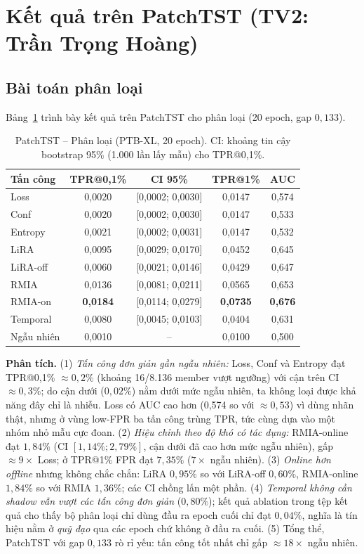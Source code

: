 \documentclass[12pt,a4paper]{report}
\begin{document}
\section{Kết quả trên PatchTST (TV2: Trần Trọng Hoàng)}

\subsection{Bài toán phân loại}

Bảng~\ref{tab:patchtst_cls} trình bày kết quả trên PatchTST cho phân loại (20 epoch, gap $0{,}133$).

\begin{table}[H]
\centering
\caption{PatchTST -- Phân loại (PTB-XL, 20 epoch). CI: khoảng tin cậy bootstrap 95\% (1.000 lần lấy mẫu) cho TPR@0,1\%.}
\label{tab:patchtst_cls}
\begin{tabular}{lcccc}
\toprule
\textbf{Tấn công} & \textbf{TPR@0,1\%} & \textbf{CI 95\%} & \textbf{TPR@1\%} & \textbf{AUC} \\
\midrule
Loss      & 0,0020 & [0,0002; 0,0030] & 0,0147 & 0,574 \\
Conf      & 0,0020 & [0,0002; 0,0030] & 0,0147 & 0,533 \\
Entropy   & 0,0021 & [0,0002; 0,0031] & 0,0147 & 0,532 \\
LiRA      & 0,0095 & [0,0029; 0,0170] & 0,0452 & 0,645 \\
LiRA-off  & 0,0060 & [0,0021; 0,0146] & 0,0429 & 0,647 \\
RMIA      & 0,0136 & [0,0081; 0,0211] & 0,0565 & 0,653 \\
RMIA-on   & \textbf{0,0184} & [0,0114; 0,0279] & \textbf{0,0735} & \textbf{0,676} \\
Temporal  & 0,0080 & [0,0045; 0,0103] & 0,0404 & 0,631 \\
\midrule
Ngẫu nhiên & 0,0010 & -- & 0,0100 & 0,500 \\
\bottomrule
\end{tabular}
\end{table}

\textbf{Phân tích.} (1) \textit{Tấn công đơn giản gần ngẫu nhiên:} Loss, Conf và Entropy đạt TPR@0,1\% $\approx 0{,}2\%$ (khoảng 16/8.136 member vượt ngưỡng) với cận trên CI $\approx 0{,}3\%$; do cận dưới ($0{,}02\%$) nằm dưới mức ngẫu nhiên, ta không loại được khả năng đây chỉ là nhiễu. Loss có AUC cao hơn (0,574 so với $\approx 0{,}53$) vì dùng nhãn thật, nhưng ở vùng low-FPR ba tấn công trùng TPR, tức cùng dựa vào một nhóm nhỏ mẫu cực đoan. (2) \textit{Hiệu chỉnh theo độ khó có tác dụng:} RMIA-online đạt $1{,}84\%$ (CI $[1{,}14\%; 2{,}79\%]$, cận dưới đã cao hơn mức ngẫu nhiên), gấp $\approx 9\times$ Loss; ở TPR@1\% FPR đạt $7{,}35\%$ ($7\times$ ngẫu nhiên). (3) \textit{Online hơn offline} nhưng không chắc chắn: LiRA $0{,}95\%$ so với LiRA-off $0{,}60\%$, RMIA-online $1{,}84\%$ so với RMIA $1{,}36\%$; các CI chồng lấn một phần. (4) \textit{Temporal không cần shadow vẫn vượt các tấn công đơn giản} ($0{,}80\%$); kết quả ablation trong tệp kết quả cho thấy bộ phân loại chỉ dùng đầu ra epoch cuối chỉ đạt $0{,}04\%$, nghĩa là tín hiệu nằm ở \textit{quỹ đạo} qua các epoch chứ không ở đầu ra cuối. (5) Tổng thể, PatchTST với gap $0{,}133$ rò rỉ yếu: tấn công tốt nhất chỉ gấp $\approx 18\times$ ngẫu nhiên.
\end{document}
